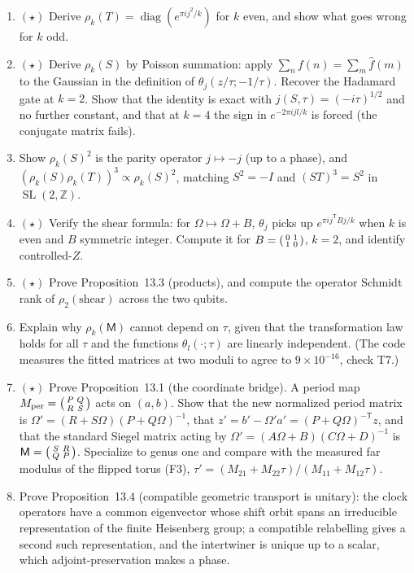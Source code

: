 \documentclass[11pt]{article}
\newcommand{\Z}{\mathbb{Z}}
\newcommand{\R}{\mathbb{R}}
\newcommand{\SL}{\operatorname{SL}}
\begin{document}
\begin{enumerate}[label=\textbf{P\arabic*.},leftmargin=*,start=30]
\item $(\star)$ Derive $\rho_k(T) = \operatorname{diag}(e^{\pi i j^2/k})$ for
  $k$ even, and show what goes wrong for $k$ odd.
\item $(\star)$ Derive $\rho_k(S)$ by Poisson summation: apply
  $\sum_n f(n) = \sum_m \hat f(m)$ to the Gaussian in the definition of
  $\theta_j(z/\tau;-1/\tau)$. Recover the Hadamard gate at $k=2$. Show that the
  identity is exact with $j(S,\tau) = (-i\tau)^{1/2}$ and no further constant,
  and that at $k = 4$ the sign in $e^{-2\pi ijl/k}$ is forced (the conjugate
  matrix fails).
\item Show $\rho_k(S)^2$ is the parity operator $j\mapsto -j$ (up to a
  phase), and $(\rho_k(S)\rho_k(T))^3\propto\rho_k(S)^2$, matching
  $S^2 = -I$ and $(ST)^3 = S^2$ in $\SL(2,\Z)$.
\item $(\star)$ Verify the shear formula: for $\Omega\mapsto\Omega+B$,
  $\theta_j$ picks up $e^{\pi i j^{\mathsf T}Bj/k}$ when $k$ is even and $B$
  symmetric integer. Compute it for $B = \begin{psmallmatrix}0&1\\1&0\end{psmallmatrix}$,
  $k = 2$, and identify controlled-$Z$.
\item $(\star)$ Prove Proposition~13.3 (products), and compute the operator
  Schmidt rank of $\rho_2(\text{shear})$ across the two qubits.
\item Explain why $\rho_k(\mathsf M)$ cannot depend on $\tau$, given that the
  transformation law holds for all $\tau$ and the functions $\theta_l(\cdot;\tau)$
  are linearly independent. (The code measures the fitted matrices at two
  moduli to agree to $9\times10^{-16}$, check T7.)
\item $(\star)$ Prove Proposition~13.1 (the coordinate bridge). A period map
  $M_{\rm per} = \begin{psmallmatrix}P&Q\\R&S\end{psmallmatrix}$ acts on $(a,b)$.
  Show that the new normalized period matrix is $\Omega' = (R+S\Omega)(P+Q\Omega)^{-1}$,
  that $z' = b'-\Omega'a' = (P+Q\Omega)^{-\mathsf T}z$, and that the standard
  Siegel matrix acting by $\Omega' = (A\Omega+B)(C\Omega+D)^{-1}$ is
  $\mathsf M = \begin{psmallmatrix}S&R\\Q&P\end{psmallmatrix}$. Specialize to genus
  one and compare with the measured far modulus of the flipped torus (F3),
  $\tau' = (M_{21}+M_{22}\tau)/(M_{11}+M_{12}\tau)$.
\item Prove Proposition~13.4 (compatible geometric transport is unitary): the
  clock operators have a common eigenvector whose shift orbit spans an
  irreducible representation of the finite Heisenberg group; a compatible
  relabelling gives a second such representation, and the intertwiner is
  unique up to a scalar, which adjoint-preservation makes a phase.
\end{enumerate}
\end{document}
